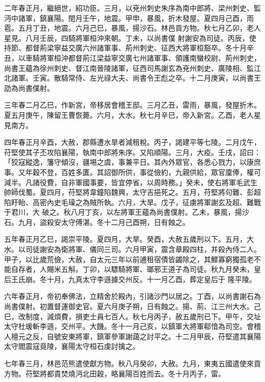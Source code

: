 \begin{pinyinscope}
 二年春正月，繼絕世，紹功臣。三月，以兗州刺史朱序為南中郎將、梁州刺史、監沔中諸軍，鎮襄陽。閏月壬午，地震。甲申，暴風，折木發屋。夏四月己酉，雨雹。五月丁丑，地震。六月己巳，暴風，揚沙石。林邑貢方物。秋七月乙卯，老人星見。八月壬辰，四騎將軍桓沖來朝。丁未，以尚書僕
 射謝安為司徒。丙辰，使持節、都督荊梁寧益交廣六州諸軍事、荊州刺史、征西大將軍桓豁卒。冬十月辛丑，以車騎將軍桓沖都督荊江梁益寧交廣七州諸軍事、領護南蠻校尉、荊州刺史，尚書王蘊為徐州刺史、督江南晉陵諸軍，征西司馬謝玄為兗州刺史、廣陵相、監江北諸軍。壬寅。散騎常侍、左光祿大夫、尚書令王彪之卒。十二月庚寅，以尚書王劭為尚書僕射。



 三年春二月乙巳，作新宮，帝移居會稽王邸。三月乙丑，雷雨，暴風，發屋折木。夏五月庚午，陳留王曹恢薨。六月，大水。秋七月辛巳，帝入新宮。乙酉，老人星見南方。



 四年春正月辛酉，大赦，郡縣遭水旱者減租稅。丙子，謁建平等七陵。二月戊午，苻堅使其子丕攻陷襄陽，執南中郎將朱序。又陷順陽。三月，大疫。壬戌，詔曰：「狡寇縱逸，籓守傾沒，疆埸之虞，事兼平日。其內外眾官，各悉心戮力，以康庶事。又年穀不登，百姓多匱。其詔御所供，事從儉約，九親供給，眾官廩俸，權可減半。凡諸役費，自非軍國事要，皆宜停省，以周時務。」癸未，使右將軍毛武生帥師伐蜀。夏四月，苻堅將韋鐘陷魏興，太守吉挹死之。五月，苻堅將句難、彭超陷盱眙、高密內史毛璪之為賊所執。六月，大旱。戊子，征虜將軍謝玄及超、難戰于君川，大
 破之。秋八月丁亥，以左將軍王蘊為尚書僕射。乙未，暴風，揚沙石。九月，盜殺安太守傅湛。冬十二月己酉朔，日有蝕之。



 五年春正月乙巳，謁崇平陵。夏四月，大旱。癸酉，大赦五歲刑以下。五月，大水。以司徒謝安為衛將軍、儀同三司。六月甲寅，震含章殿四柱，并殺內侍二人。甲子，以比歲荒儉，大赦，自太元三年以前逋租宿債皆蠲除之，其鰥寡窮獨孤老不能自存者，人賜米五斛。丁卯，以驃騎將軍、瑯邪王道子為司徒。秋九月癸未，皇后王氏崩。冬十月，九真太守李遜據交州反。十一月乙酉，葬定皇后于
 隆平陵。



 六年春正月，帝初奉佛法，立精舍於殿內，引諸沙門以居之。丁酉，以尚書謝石為尚書僕射。初置督運御史官。夏六月庚子朔，日有蝕之。揚、荊、江三州大水。己巳，改制度，減煩費，損吏士員七百人。秋七月丙子，赦五歲刑已下。甲午，交址太守杜瑗斬李遜，交州平。大饑。冬十一月己亥，以鎮軍大將軍郗愔為司空。會稽人檀元之反，自號安東將軍，鎮軍參軍謝藹之討平之。十二月甲辰，苻堅遣其襄陽太守閻震寇竟陵，襄陽太守桓石虔討擒之。



 七年春三月，林邑范熊遣使獻方物。秋八月癸卯，大赦。九月，東夷五國遣使來貢方物。苻堅將都貴焚燒沔北田穀，略襄陽百姓而去。冬十月丙子，雷。




\end{pinyinscope}
